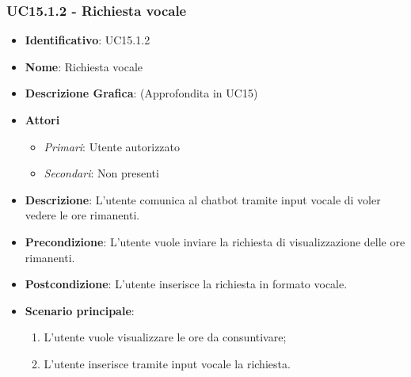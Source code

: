 \subsubsection{UC15.1.2 - Richiesta vocale}
\begin{itemize}
	\item \textbf{Identificativo}: UC15.1.2
	\item \textbf{Nome}: Richiesta vocale
	\item \textbf{Descrizione Grafica}: (Approfondita in UC15)
	\item \textbf{Attori}
	\begin{itemize} 
		\item \textit{Primari}: Utente autorizzato
		\item \textit{Secondari}: Non presenti
	\end{itemize}
	\item \textbf{Descrizione}: L'utente comunica al chatbot tramite input vocale di voler vedere le ore rimanenti.
	\item \textbf{Precondizione}: L'utente vuole inviare la richiesta di visualizzazione delle ore rimanenti.
	\item \textbf{Postcondizione}: L'utente inserisce la richiesta in formato vocale.
	\item \textbf{Scenario principale}:
	\begin{enumerate}
		\item L'utente vuole visualizzare le ore da consuntivare;
		\item L'utente inserisce tramite input vocale la richiesta.
	\end{enumerate}
\end{itemize}

